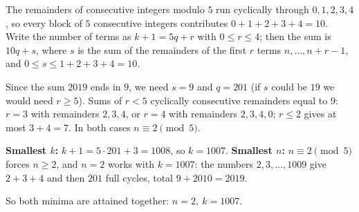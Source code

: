 The remainders of consecutive integers modulo $5$ run cyclically through $0,1,2,3,4$, so every block of $5$ consecutive integers contributes $0+1+2+3+4=10$. Write the number of terms as $k+1=5q+r$ with $0\le r\le4$; then the sum is $10q+s$, where $s$ is the sum of the remainders of the first $r$ terms $n,\dots,n+r-1$, and $0\le s\le1+2+3+4=10$.

Since the sum $2019$ ends in $9$, we need $s=9$ and $q=201$ (if $s$ could be $19$ we would need $r\ge5$). Sums of $r<5$ cyclically consecutive remainders equal to $9$: $r=3$ with remainders $2,3,4$, or $r=4$ with remainders $2,3,4,0$; $r\le2$ gives at most $3+4=7$. In both cases $n\equiv2\pmod5$.

\textbf{Smallest $k$:} $k+1=5\cdot201+3=1008$, so $k=1007$. \textbf{Smallest $n$:} $n\equiv2\pmod 5$ forces $n\ge2$, and $n=2$ works with $k=1007$: the numbers $2,3,\dots,1009$ give $2+3+4$ and then $201$ full cycles, total $9+2010=2019$.

So both minima are attained together: $\boxed{n=2,\ k=1007}$.

